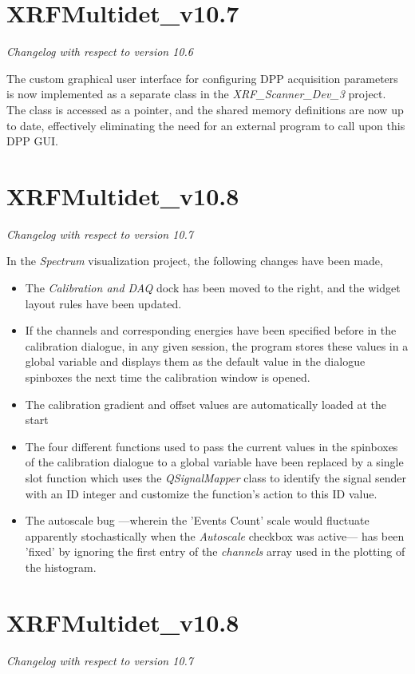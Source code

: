 \documentclass[a4paper,12pt]{article}
\begin{document}
\section{XRFMultidet\_v10.7}
\textit{Changelog with respect to version 10.6}

The custom graphical user interface for configuring DPP acquisition parameters is now implemented as a separate class in the \textit{XRF\_Scanner\_Dev\_3} project. The class is accessed as a pointer, and the shared memory definitions are now up to date, effectively eliminating the need for an external program to call upon this DPP GUI.

\section{XRFMultidet\_v10.8}
\textit{Changelog with respect to version 10.7}

In the \textit{Spectrum} visualization project, the following changes have been made,
\begin{itemize}
	\item The \textit{Calibration and DAQ} dock has been moved to the right, and the widget layout rules have been updated.
	\item If the channels and corresponding energies have been specified before in the calibration dialogue, in any given session, the program stores these values in a global variable and displays them as the default value in the dialogue spinboxes the next time the calibration window is opened.
	\item The calibration gradient and offset values are automatically loaded at the start
	\item The four different functions used to pass the current values in the spinboxes of the calibration dialogue to a global variable have been replaced by a single slot function which uses the \textit{QSignalMapper} class to identify the signal sender with an ID integer and customize the function's action to this ID value.
	\item The autoscale bug ---wherein the 'Events Count' scale would fluctuate apparently stochastically when the \textit{Autoscale} checkbox was active--- has been 'fixed' by ignoring the first entry of the \textit{channels} array used in the plotting of the histogram.
\end{itemize}

\section{XRFMultidet\_v10.8}
\textit{Changelog with respect to version 10.7}
\end{document}
